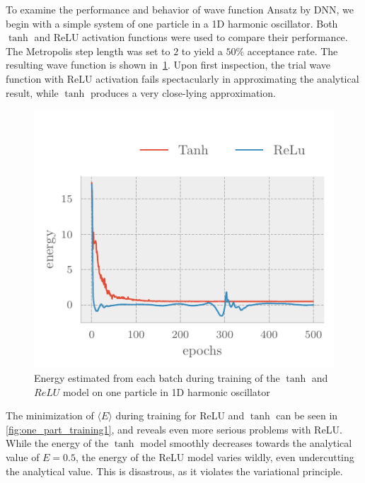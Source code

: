 To examine the performance and behavior of wave function Ansatz by DNN, we begin with
a simple system of one particle in a 1D harmonic oscillator. Both \(\tanh\) and
ReLU activation functions were used to compare their performance. The
Metropolis step length was set to \(2\) to yield a \(50\%\) acceptance rate. The
resulting wave function is shown in~\cref{fig:one_part_training1}.
Upon first inspection, the trial wave function with ReLU activation 
fails spectacularly in approximating the analytical result, while
$\tanh$ produces a very close-lying approximation.


\begin{figure}[H]
	\includegraphics[]{figures/one_part_training1.pdf}
	\caption{Energy estimated from each batch during training of the $\tanh$ and $ReLU$ model on one particle in 1D harmonic oscillator}
	\label{fig:one_part_training1}
\end{figure}

The minimization of $\langle E \rangle$ during training for ReLU and $\tanh$
can be seen in \autoref{fig:one_part_training1}, and reveals even more
serious problems with ReLU. While the energy of the $\tanh$ model smoothly
decreases towards the analytical value of $E=0.5$, the energy of the ReLU
model varies wildly, even undercutting the analytical value. This is disastrous,
as it violates the variational principle.


